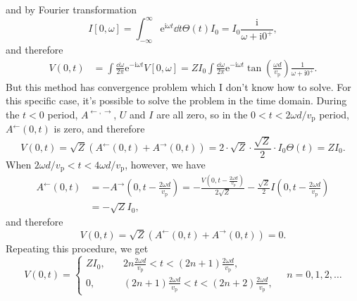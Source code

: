 \documentclass[hyperref, a4paper]{article}
\newcommand*{\ii}{\mathrm{i}}
\newcommand*{\ee}{\mathrm{e}}
\begin{document}
and by Fourier transformation
\begin{equation}
    I[0, \omega] = \int^{\infty}_{-\infty} \ee^{\ii \omega t} \dd{t} \Theta(t) I_0 = I_0 \frac{\ii}{\omega + \ii 0^+},
\end{equation}
and therefore 
\begin{equation}
    \begin{aligned}
        V(0, t) &= \int \frac{\dd{\omega}}{2\pi} \ee^{- \ii \omega t} V[0, \omega] = 
        ZI_0 \int \frac{\dd{\omega}}{2\pi} \ee^{- \ii \omega t} 
        \tan\left(\frac{\omega d}{v_{\text{p}}}\right) \frac{1}{\omega + \ii 0^+}. 
    \end{aligned}
\end{equation}
But this method has convergence problem which I don't know how to solve.
For this specific case, it's possible to solve the problem in the time domain.
During the $t < 0$ period, $A^{\leftarrow, \rightarrow}$, $U$ and $I$ are all zero,
so in the $0 < t < 2 \omega d / v_{\text{p}}$ period, 
$A^{\leftarrow}(0, t)$ is zero,
and therefore 
\begin{equation}
    V(0, t) = \sqrt{Z} (A^{\leftarrow}(0, t) + A^{\rightarrow}(0, t)) 
    = 2 \cdot \sqrt{Z} \cdot \frac{\sqrt{Z}}{2} \cdot I_0 \Theta(t) = Z I_0.
\end{equation}
When $2 \omega d / v_{\text{p}} < t < 4 \omega d / v_{\text{p}}$, however, we have 
\begin{equation}
    \begin{aligned}
        A^{\leftarrow}(0, t) &= - A^{\rightarrow}\left(0, t - \frac{2 \omega d}{v_{\text{p}}}\right)
        = - \frac{V\left(0, t - \frac{2 \omega d}{v_{\text{p}}}\right)}{2 \sqrt{Z}} - 
        \frac{\sqrt{Z}}{2} I\left(0, t - \frac{2 \omega d}{v_{\text{p}}}\right) \\
        &= - \sqrt{Z} I_0,
    \end{aligned}
\end{equation}
and therefore 
\begin{equation}
    V(0, t) = \sqrt{Z} (A^{\leftarrow}(0, t) + A^{\rightarrow}(0, t)) = 0.
\end{equation}
Repeating this procedure, we get 
\begin{equation}
    V(0, t) = \begin{cases}
        Z I_0, &\quad 2n \frac{2 \omega d}{v_{\text{p}}} < t < (2n+1) \frac{2 \omega d}{v_{\text{p}}}, \\
        0    , &\quad (2n+1) \frac{2 \omega d}{v_{\text{p}}} < t < (2n+2) \frac{2 \omega d}{v_{\text{p}}},
    \end{cases} \quad 
    n = 0, 1, 2, \ldots
\end{equation}
\end{document}
